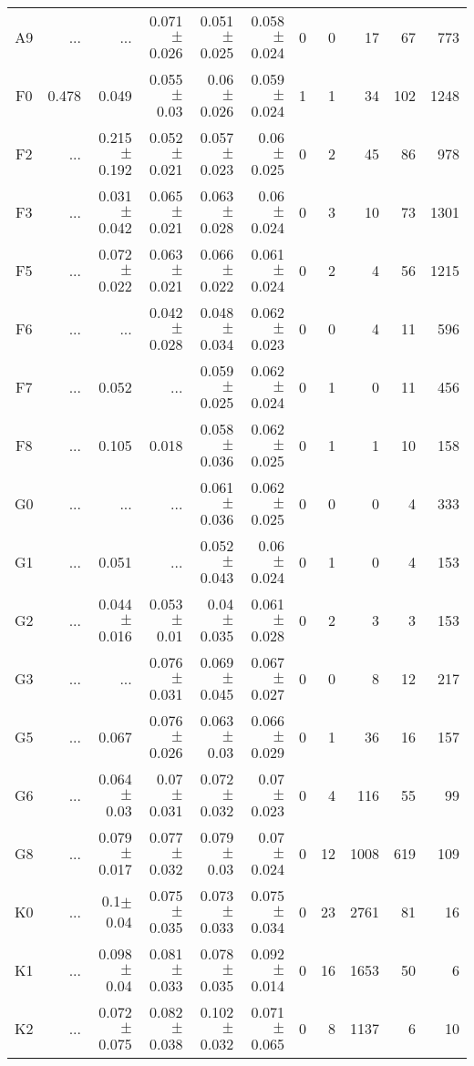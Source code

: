 \begin{table}[t]
\begin{table}[t]
\begin{center}
\begin{tabular}{c|rrrrr|rrrrr}
    A9	&	 ...	&	 ...	&	0.071$\pm$0.026	&	0.051$\pm$0.025	&	0.058$\pm$0.024	&	0	&	0	&	17	&	67	&	773	\\
    F0	&	0.478	&	0.049	&	0.055$\pm$0.03	&	0.06$\pm$0.026	&	0.059$\pm$0.024	&	1	&	1	&	34	&	102	&	1248	\\
    F2	&	 ...	&	0.215$\pm$0.192	&	0.052$\pm$0.021	&	0.057$\pm$0.023	&	0.06$\pm$0.025	&	0	&	2	&	45	&	86	&	978	\\
    F3	&	 ...	&	0.031$\pm$0.042	&	0.065$\pm$0.021	&	0.063$\pm$0.028	&	0.06$\pm$0.024	&	0	&	3	&	10	&	73	&	1301	\\
    F5	&	 ...	&	0.072$\pm$0.022	&	0.063$\pm$0.021	&	0.066$\pm$0.022	&	0.061$\pm$0.024	&	0	&	2	&	4	&	56	&	1215	\\
    F6	&	 ...	&	 ...	&	0.042$\pm$0.028	&	0.048$\pm$0.034	&	0.062$\pm$0.023	&	0	&	0	&	4	&	11	&	596	\\
    F7	&	 ...	&	0.052	&	 ...	&	0.059$\pm$0.025	&	0.062$\pm$0.024	&	0	&	1	&	0	&	11	&	456	\\
    F8	&	 ...	&	0.105	&	0.018	&	0.058$\pm$0.036	&	0.062$\pm$0.025	&	0	&	1	&	1	&	10	&	158	\\
    G0	&	 ...	&	 ...	&	 ...	&	0.061$\pm$0.036	&	0.062$\pm$0.025	&	0	&	0	&	0	&	4	&	333	\\
    G1	&	 ...	&	0.051	&	 ...	&	0.052$\pm$0.043	&	0.06$\pm$0.024	&	0	&	1	&	0	&	4	&	153	\\
    G2	&	 ...	&	0.044$\pm$0.016	&	0.053$\pm$0.01	&	0.04$\pm$0.035	&	0.061$\pm$0.028	&	0	&	2	&	3	&	3	&	153	\\
    G3	&	 ...	&	 ...	&	0.076$\pm$0.031	&	0.069$\pm$0.045	&	0.067$\pm$0.027	&	0	&	0	&	8	&	12	&	217	\\
    G5	&	 ...	&	0.067	&	0.076$\pm$0.026	&	0.063$\pm$0.03	&	0.066$\pm$0.029	&	0	&	1	&	36	&	16	&	157	\\
    G6	&	 ...	&	0.064$\pm$0.03	&	0.07$\pm$0.031	&	0.072$\pm$0.032	&	0.07$\pm$0.023	&	0	&	4	&	116	&	55	&	99	\\
    G8	&	 ...	&	0.079$\pm$0.017	&	0.077$\pm$0.032	&	0.079$\pm$0.03	&	0.07$\pm$0.024	&	0	&	12	&	1008	&	619	&	109	\\
    K0	&	 ...	&	0.1$\pm$0.04	&	0.075$\pm$0.035	&	0.073$\pm$0.033	&	0.075$\pm$0.034	&	0	&	23	&	2761	&	81	&	16	\\
    K1	&	 ...	&	0.098$\pm$0.04	&	0.081$\pm$0.033	&	0.078$\pm$0.035	&	0.092$\pm$0.014	&	0	&	16	&	1653	&	50	&	6	\\
    K2	&	 ...	&	0.072$\pm$0.075	&	0.082$\pm$0.038	&	0.102$\pm$0.032	&	0.071$\pm$0.065	&	0	&	8	&	1137	&	6	&	10	\\

\end{tabular}
\end{center}
\end{table}
\end{table}
